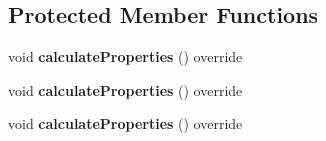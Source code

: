 \subsection*{Protected Member Functions}
\begin{DoxyCompactItemize}
\item 
\mbox{\label{class_prv_with_desuperheating_af400ed7c148f708ca087bd79228586f3}} 
void {\bfseries calculate\+Properties} () override
\item 
\mbox{\label{class_prv_with_desuperheating_af400ed7c148f708ca087bd79228586f3}} 
void {\bfseries calculate\+Properties} () override
\item 
\mbox{\label{class_prv_with_desuperheating_af400ed7c148f708ca087bd79228586f3}} 
void {\bfseries calculate\+Properties} () override
\end{DoxyCompactItemize}
